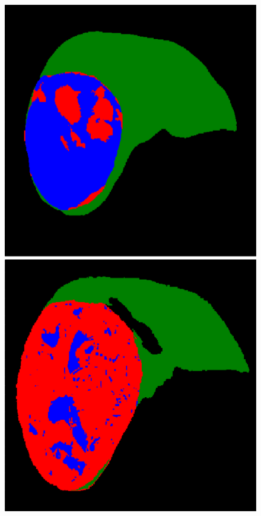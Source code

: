 \begin{figure}[!ht]
\begin{minipage}{4cm}
\end{minipage} \hspace{-0.3cm}
\begin{minipage}{4cm}
\includegraphics[width=\linewidth]{./images/5_2_gt_resized}
\end{minipage} \hspace{-0.3cm}
\begin{minipage}{4cm}
\includegraphics[width=\linewidth]{./images/5_8_gt_resized}

\end{minipage}
\end{figure}
